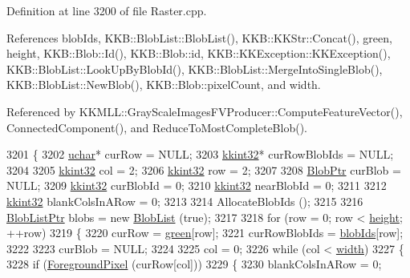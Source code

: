 Definition at line 3200 of file Raster.\+cpp.



References blob\+Ids, K\+K\+B\+::\+Blob\+List\+::\+Blob\+List(), K\+K\+B\+::\+K\+K\+Str\+::\+Concat(), green, height, K\+K\+B\+::\+Blob\+::\+Id(), K\+K\+B\+::\+Blob\+::id, K\+K\+B\+::\+K\+K\+Exception\+::\+K\+K\+Exception(), K\+K\+B\+::\+Blob\+List\+::\+Look\+Up\+By\+Blob\+Id(), K\+K\+B\+::\+Blob\+List\+::\+Merge\+Into\+Single\+Blob(), K\+K\+B\+::\+Blob\+List\+::\+New\+Blob(), K\+K\+B\+::\+Blob\+::pixel\+Count, and width.



Referenced by K\+K\+M\+L\+L\+::\+Gray\+Scale\+Images\+F\+V\+Producer\+::\+Compute\+Feature\+Vector(), Connected\+Component(), and Reduce\+To\+Most\+Complete\+Blob().


\begin{DoxyCode}
3201 \{
3202   \hyperlink{namespace_k_k_b_ace9969169bf514f9ee6185186949cdf7}{uchar}*   curRow         = NULL;
3203   \hyperlink{namespace_k_k_b_a8fa4952cc84fda1de4bec1fbdd8d5b1b}{kkint32}*   curRowBlobIds  = NULL;
3204 
3205   \hyperlink{namespace_k_k_b_a8fa4952cc84fda1de4bec1fbdd8d5b1b}{kkint32}  col = 2;
3206   \hyperlink{namespace_k_k_b_a8fa4952cc84fda1de4bec1fbdd8d5b1b}{kkint32}  row = 2;
3207 
3208   \hyperlink{class_k_k_b_1_1_blob}{BlobPtr}  curBlob    = NULL;
3209   \hyperlink{namespace_k_k_b_a8fa4952cc84fda1de4bec1fbdd8d5b1b}{kkint32}  curBlobId  = 0;
3210   \hyperlink{namespace_k_k_b_a8fa4952cc84fda1de4bec1fbdd8d5b1b}{kkint32}  nearBlobId = 0;
3211 
3212   \hyperlink{namespace_k_k_b_a8fa4952cc84fda1de4bec1fbdd8d5b1b}{kkint32}  blankColsInARow = 0;
3213 
3214   AllocateBlobIds ();  
3215 
3216   \hyperlink{class_k_k_b_1_1_blob_list}{BlobListPtr} blobs = \textcolor{keyword}{new} \hyperlink{class_k_k_b_1_1_blob_list}{BlobList} (\textcolor{keyword}{true});
3217 
3218   \textcolor{keywordflow}{for}  (row = 0;  row < \hyperlink{class_k_k_b_1_1_raster_af39ff189de4fbb6de98392e187efafb7}{height};  ++row)
3219   \{
3220     curRow        = \hyperlink{class_k_k_b_1_1_raster_a2d2238911145488e226cd2e34fc8448c}{green}[row];
3221     curRowBlobIds = \hyperlink{class_k_k_b_1_1_raster_a0fc9a1588e809db0b701f0a886bfd18c}{blobIds}[row];
3222 
3223     curBlob = NULL;
3224 
3225     col = 0;
3226     \textcolor{keywordflow}{while}  (col < \hyperlink{class_k_k_b_1_1_raster_ae0bcc103e191c3421d7692dc69ceb554}{width})
3227     \{
3228       \textcolor{keywordflow}{if}  (\hyperlink{class_k_k_b_1_1_raster_aa1e1363589e719eb64f0957281b84b6a}{ForegroundPixel} (curRow[col]))
3229       \{
3230         blankColsInARow = 0;

\end{DoxyCode}
